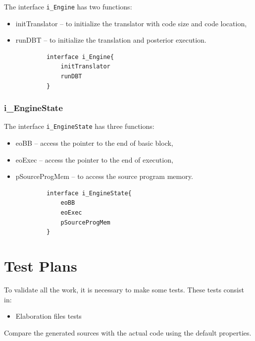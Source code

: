 \documentclass{report}
\begin{document}
			\par The interface \texttt{i\_Engine} has two functions:
			\begin{itemize}
				\item initTranslator -- to initialize the translator with code size and code location,
				\item runDBT -- to initialize the translation and posterior execution.
			\end{itemize}
			
			\begin{lstlisting}
			interface i_Engine{
				initTranslator
				runDBT
			}
			\end{lstlisting}
			
			\subsubsection*{i\_EngineState}		
			
			\par The interface \texttt{i\_EngineState} has three functions:
			\begin{itemize}
				\item eoBB -- access the pointer to the end of basic block,
				\item eoExec -- access the pointer to the end of execution,
				\item pSourceProgMem -- to access the source program memory.
			\end{itemize}	
			
			\begin{lstlisting}
			interface i_EngineState{
				eoBB
				eoExec
				pSourceProgMem
			}
			\end{lstlisting}	

	\section{Test Plans}
	
	\par To validate all the work, it is necessary to make some tests. These tests consist in:
	\begin{itemize}
		\item Elaboration files tests
	\end{itemize}
	\par Compare the generated sources with the actual code	using the default properties.
	
\end{document}
